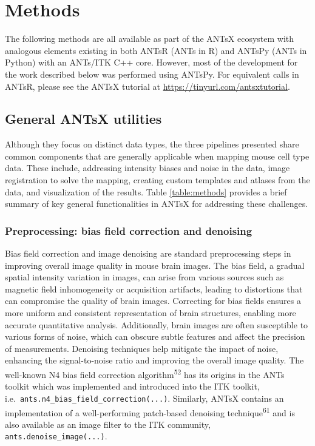 \documentclass[
  12pt,
]{article}
\begin{document}
\clearpage
\newpage

\section{Methods}\label{methods}

The following methods are all available as part of the ANTsX ecosystem
with analogous elements existing in both ANTsR (ANTs in R) and ANTsPy
(ANTs in Python) with an ANTs/ITK C++ core. However, most of the
development for the work described below was performed using ANTsPy. For
equivalent calls in ANTsR, please see the ANTsX tutorial at
\url{https://tinyurl.com/antsxtutorial}.

\subsection{General ANTsX utilities}\label{general-antsx-utilities}

Although they focus on distinct data types, the three pipelines
presented share common components that are generally applicable when
mapping mouse cell type data. These include, addressing intensity biases
and noise in the data, image registration to solve the mapping, creating
custom templates and atlases from the data, and visualization of the
results. Table \ref{table:methods} provides a brief summary of key
general functionalities in ANTsX for addressing these challenges.



\subsubsection{Preprocessing: bias field correction and
denoising}\label{preprocessing-bias-field-correction-and-denoising}

Bias field correction and image denoising are standard preprocessing
steps in improving overall image quality in mouse brain images. The bias
field, a gradual spatial intensity variation in images, can arise from
various sources such as magnetic field inhomogeneity or acquisition
artifacts, leading to distortions that can compromise the quality of
brain images. Correcting for bias fields ensures a more uniform and
consistent representation of brain structures, enabling more accurate
quantitative analysis. Additionally, brain images are often susceptible
to various forms of noise, which can obscure subtle features and affect
the precision of measurements. Denoising techniques help mitigate the
impact of noise, enhancing the signal-to-noise ratio and improving the
overall image quality. The well-known N4 bias field correction
algorithm\textsuperscript{52} has its origins in the ANTs toolkit which
was implemented and introduced into the ITK toolkit,
i.e.~\texttt{ants.n4\_bias\_field\_correction(...)}. Similarly, ANTsX
contains an implementation of a well-performing patch-based denoising
technique\textsuperscript{61} and is also available as an image filter
to the ITK community, \texttt{ants.denoise\_image(...)}.
\end{document}
